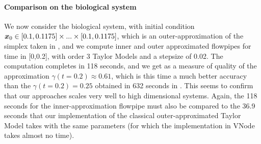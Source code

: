 





\paragraph{Comparison on the biological system}
We now consider the biological system, with initial condition $\x_0 \in [0.1,0.1175] \times...\times [0.1,0.1175]$, which is an outer-approximation
of the simplex taken in  \cite{Underapproxflowpipes}, and we compute inner and outer approximated flowpipes for time in [0,0.2], 
with order 3 Taylor Models and a stepsize of 0.02. The computation completes in 118 seconds, and we get as a measure of quality of the approximation 
$\gamma(t=0.2) \approx 0.61$, which is this time a much better accuracy than the $\gamma(t=0.2) = 0.25$ obtained in 632 seconds in  \cite{Underapproxflowpipes}. 
This seems to confirm that our approaches scales very well to high dimensional systems. 
Again, the 118 seconds for the inner-approximation flowpipe must also be compared to the 36.9 seconds that our implementation of the classical 
outer-approximated Taylor Model takes with the same parameters (for which the implementation in VNode takes almost no time).

